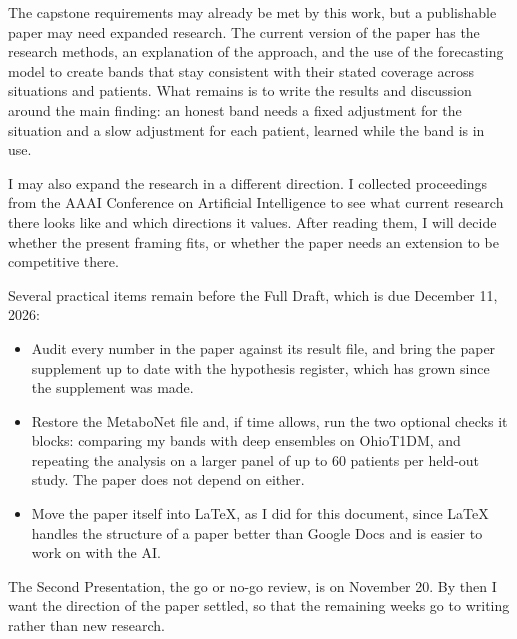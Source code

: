 The capstone requirements may already be met by this work, but a publishable paper may need expanded research. The current version of the paper has the research methods, an explanation of the approach, and the use of the forecasting model to create bands that stay consistent with their stated coverage across situations and patients. What remains is to write the results and discussion around the main finding: an honest band needs a fixed adjustment for the situation and a slow adjustment for each patient, learned while the band is in use.

I may also expand the research in a different direction. I collected proceedings from the AAAI Conference on Artificial Intelligence to see what current research there looks like and which directions it values. After reading them, I will decide whether the present framing fits, or whether the paper needs an extension to be competitive there. 

Several practical items remain before the Full Draft, which is due December 11, 2026:

\begin{itemize}
\item Audit every number in the paper against its result file, and bring the paper supplement up to date with the hypothesis register, which has grown since the supplement was made.
\item Restore the MetaboNet file and, if time allows, run the two optional checks it blocks: comparing my bands with deep ensembles on OhioT1DM, and repeating the analysis on a larger panel of up to 60 patients per held-out study. The paper does not depend on either.
\item Move the paper itself into LaTeX, as I did for this document, since LaTeX handles the structure of a paper better than Google Docs and is easier to work on with the AI.
\end{itemize}

The Second Presentation, the go or no-go review, is on November 20. By then I want the direction of the paper settled, so that the remaining weeks go to writing rather than new research. 
